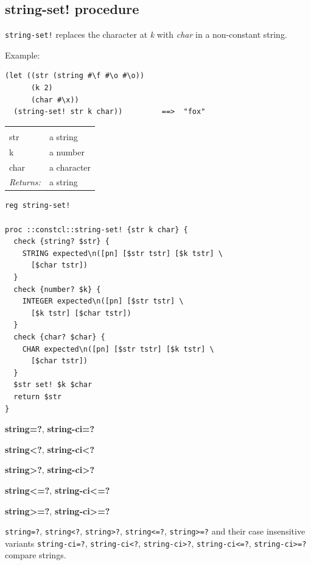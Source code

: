 \documentclass[twoside]{report}
\begin{document}
\subsection{string-set! procedure}
\label{stringset-procedure}

\texttt{string-set!} replaces the character at \emph{k} with \emph{char} in a non-constant string.

Example:

\begin{verbatim}
(let ((str (string #\f #\o #\o))
      (k 2)
      (char #\x))
  (string-set! str k char))         ==>  "fox"
\end{verbatim}

\noindent\begin{tabular}{ |p{1.9cm} p{8cm}| }
\hline
\rowcolor[HTML]{CCCCCC} \multicolumn{2}{|l|}{\bf string-set! (public)} \\
str & a string \\
k & a number \\
char & a character \\
\textit{Returns:} & a string \\
\hline
\end{tabular}

\begin{lstlisting}
reg string-set!

proc ::constcl::string-set! {str k char} {
  check {string? $str} {
    STRING expected\n([pn] [$str tstr] [$k tstr] \
      [$char tstr])
  }
  check {number? $k} {
    INTEGER expected\n([pn] [$str tstr] \
      [$k tstr] [$char tstr])
  }
  check {char? $char} {
    CHAR expected\n([pn] [$str tstr] [$k tstr] \
      [$char tstr])
  }
  $str set! $k $char
  return $str
}
\end{lstlisting}

\textbf{string=?}, \textbf{string-ci=?}

\textbf{string<?}, \textbf{string-ci<?}

\textbf{string>?}, \textbf{string-ci>?}

\textbf{string<=?}, \textbf{string-ci<=?}

\textbf{string>=?}, \textbf{string-ci>=?}

\texttt{string=?}, \texttt{string<?}, \texttt{string>?}, \texttt{string<=?}, \texttt{string>=?} and their case insensitive variants \texttt{string-ci=?}, \texttt{string-ci<?}, \texttt{string-ci>?}, \texttt{string-ci<=?}, \texttt{string-ci>=?} compare strings.
\end{document}
